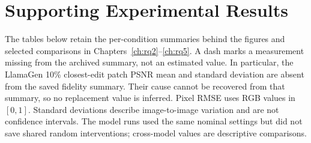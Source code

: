 \chapter{Supporting Experimental Results}
\label{app:supporting_results}

The tables below retain the per-condition summaries behind the figures and
selected comparisons in Chapters~\ref{ch:rq2}--\ref{ch:rq5}. A dash marks a
measurement missing from the archived summary, not an estimated value.
In particular, the LlamaGen 10\% closest-edit patch PSNR mean and standard
deviation are absent from the saved fidelity summary. Their cause cannot be
recovered from that summary, so no replacement value is inferred. Pixel RMSE
uses RGB values in $[0,1]$. Standard deviations describe image-to-image
variation and are not confidence intervals.
The model runs used the same nominal settings but did not save shared random
interventions; cross-model values are descriptive comparisons.

